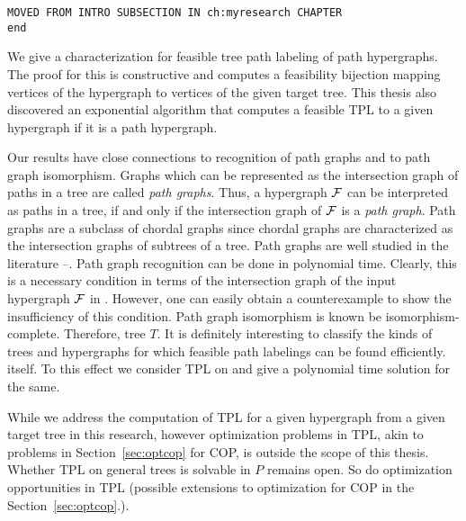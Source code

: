 \begin{center} {\tt MOVED FROM INTRO SUBSECTION IN ch:myresearch
    CHAPTER\\ end}
\end{center}

We give a characterization for feasible tree path labeling of path
hypergraphs. The proof for this is constructive and computes a
feasibility bijection mapping vertices of the hypergraph to vertices
of the given target tree. This thesis also discovered an exponential
algorithm that computes a feasible TPL to a given hypergraph if it is
a path hypergraph.

Our results have close connections to recognition of path graphs and
to path graph isomorphism.  Graphs which can be represented as the
intersection graph of paths in a tree are called {\em path
  graphs}\cite{mcg04}. Thus, a hypergraph ${\cal F}$ can be interpreted as
paths in a tree, if and only if the intersection graph of ${\cal F}$ is a
{\em path graph}. Path graphs are a subclass of chordal graphs since
chordal graphs are characterized as the intersection graphs of
subtrees of a tree\cite{mcg04}.  Path graphs are well studied in the
literature \cite{plr70}--\cite{mcg04}.  Path graph recognition can be done in
polynomial time\cite{gav78,aas93}.  Clearly, this is a necessary
condition in terms of the intersection graph of the input hypergraph
${\cal F}$ in \FTPL. However, one can easily obtain a counterexample to
show the insufficiency of this condition.  Path graph isomorphism is known be
isomorphism-complete\cite{kklv10}. Therefore,  tree $T$.  It is
definitely interesting to classify the kinds of trees and hypergraphs
for which feasible path labelings can be  found
efficiently.   itself.  To this effect
we consider TPL on {\kstar} and give a polynomial time solution for
the same.


While we address the computation of TPL for a given
hypergraph%
from a given target tree in this research, however optimization
problems in TPL, akin to problems in Section~\ref{sec:optcop} for COP,
is outside the scope of this thesis. Whether TPL on general trees is
solvable in $P$ remains open. So do optimization opportunities in TPL
(possible extensions to optimization for COP in the
Section~\ref{sec:optcop}.).


